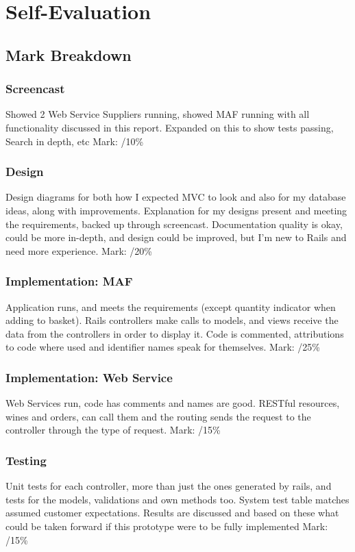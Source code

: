 \documentclass[12pt]{article}
\begin{document}

\section{Self-Evaluation}
\subsection{Mark Breakdown}
\subsubsection{Screencast}
Showed 2 Web Service Suppliers running, showed MAF running with all functionality discussed in this report. Expanded on this to show tests passing, Search in depth, etc
Mark: /10\%

\subsubsection{Design}
Design diagrams for both how I expected MVC to look and also for my database ideas, along with improvements. Explanation for my designs present and meeting the requirements, backed up through screencast. Documentation quality is okay, could be more in-depth, and design could be improved, but I'm new to Rails and need more experience.
Mark: /20\%

\subsubsection{Implementation: MAF}
Application runs, and meets the requirements (except quantity indicator when adding to basket). Rails controllers make calls to models, and views receive the data from the controllers in order to display it. Code is commented, attributions to code where used and identifier names speak for themselves.
Mark: /25\%

\subsubsection{Implementation: Web Service}
Web Services run, code has comments and names are good. RESTful resources, wines and orders, can call them and the routing sends the request to the controller through the type of request.
Mark: /15\%

\subsubsection{Testing}
Unit tests for each controller, more than just the ones generated by rails, and tests for the models, validations and own methods too. System test table matches assumed customer expectations. Results are discussed and based on these what could be taken forward if this prototype were to be fully implemented
Mark: /15\%
\end{document}
